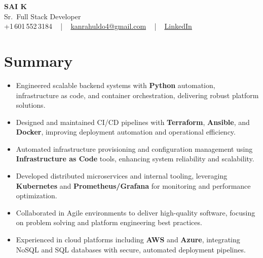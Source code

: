 \documentclass[letterpaper,11pt]{article}
\newcommand{\resumeItem}[1]{
  \item\footnotesize{
    {#1 \vspace{-2pt}}
  }
}
\newcommand{\resumeItemListStart}{\begin{itemize}[leftmargin=*]}
\newcommand{\resumeItemListEnd}{\end{itemize}\vspace{-5pt}}
\begin{document}
\begin{center}
    {\fontsize{14pt}{12pt}\selectfont \textbf{\MakeUppercase{Sai K}}}\\ \vspace{2pt}
    \fontsize{10pt}{12pt}\selectfont Sr.\ Full Stack Developer\\ \vspace{2pt}
    \fontsize{10pt}{12pt}\selectfont +1\,601\,552\,3184 ~ | ~
    \href{mailto:kanrahuldo4@gmail.com}{kanrahuldo4@gmail.com} ~ | ~
    \href{https://www.linkedin.com/in/srrrk/}{\color{blue}\underline{LinkedIn}}
    \vspace{-10pt}
\end{center}

\section{Summary}
\fontsize{9pt}{10pt}\selectfont
\resumeItemListStart
  \resumeItem{Engineered scalable backend systems with \textbf{Python} automation, infrastructure as code, and container orchestration, delivering robust platform solutions.}
  \resumeItem{Designed and maintained CI/CD pipelines with \textbf{Terraform}, \textbf{Ansible}, and \textbf{Docker}, improving deployment automation and operational efficiency.}
  \resumeItem{Automated infrastructure provisioning and configuration management using \textbf{Infrastructure as Code} tools, enhancing system reliability and scalability.}
  \resumeItem{Developed distributed microservices and internal tooling, leveraging \textbf{Kubernetes} and \textbf{Prometheus/Grafana} for monitoring and performance optimization.}
  \resumeItem{Collaborated in Agile environments to deliver high-quality software, focusing on problem solving and platform engineering best practices.}
  \resumeItem{Experienced in cloud platforms including \textbf{AWS} and \textbf{Azure}, integrating NoSQL and SQL databases with secure, automated deployment pipelines.}
\resumeItemListEnd
\vspace{-6pt}

\end{document}
